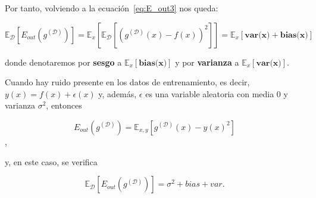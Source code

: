 Por tanto, volviendo a la ecuación~\eqref{eq:E_out3} nos queda:

\begin{equation}\label{eq:E_out8}
    \mathbb{E}_{\mathcal{D}}[E_{out}(g^{\mathcal{(D)}})] = \mathbb{E}_{x}[\mathbb{E}_{\mathcal{D}}[{(g^{\mathcal{(D)}}(x) - f(x))}^2]] = \mathbb{E}_{x}[\textbf{var(x)} + \textbf{bias(x)}]
\end{equation}

donde denotaremos por \textbf{sesgo} a $\mathbb{E}_{x}[\textbf{bias(x)}]$ y por \textbf{varianza} a $\mathbb{E}_{x}[\textbf{var(x)}]$.

\begin{observacion}
    Cuando hay ruido presente en los datos de entrenamiento, es decir, $y(x) = f(x) + \epsilon(x)$ y, además, $\epsilon$ es una variable aleatoria con media $0$ y varianza $\sigma^{2}$, entonces

    \[ E_{out}(g^{(\mathcal{D})}) = \mathbb{E}_{x, y}[g^{(\mathcal{D})}(x)-{y(x)}^{2}] \],

    y, en este caso, se verifica

    \[ \mathbb{E}_{\mathcal{D}}[E_{out}(g^{(\mathcal{D})})] = \sigma^{2} + bias + var. \]
\end{observacion}

